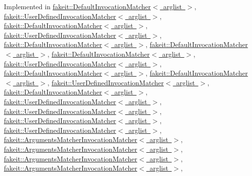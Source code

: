 Implemented in \mbox{\hyperlink{structfakeit_1_1DefaultInvocationMatcher_a6eec95726a684a4dc2498b00e68e8166}{fakeit\+::\+Default\+Invocation\+Matcher$<$ arglist $>$}}, \mbox{\hyperlink{structfakeit_1_1UserDefinedInvocationMatcher_a52f5b5e7de4484b7e9fecb166f6b80e2}{fakeit\+::\+User\+Defined\+Invocation\+Matcher$<$ arglist $>$}}, \mbox{\hyperlink{structfakeit_1_1DefaultInvocationMatcher_a6eec95726a684a4dc2498b00e68e8166}{fakeit\+::\+Default\+Invocation\+Matcher$<$ arglist $>$}}, \mbox{\hyperlink{structfakeit_1_1UserDefinedInvocationMatcher_a52f5b5e7de4484b7e9fecb166f6b80e2}{fakeit\+::\+User\+Defined\+Invocation\+Matcher$<$ arglist $>$}}, \mbox{\hyperlink{structfakeit_1_1DefaultInvocationMatcher_a6eec95726a684a4dc2498b00e68e8166}{fakeit\+::\+Default\+Invocation\+Matcher$<$ arglist $>$}}, \mbox{\hyperlink{structfakeit_1_1DefaultInvocationMatcher_a6eec95726a684a4dc2498b00e68e8166}{fakeit\+::\+Default\+Invocation\+Matcher$<$ arglist $>$}}, \mbox{\hyperlink{structfakeit_1_1DefaultInvocationMatcher_a6eec95726a684a4dc2498b00e68e8166}{fakeit\+::\+Default\+Invocation\+Matcher$<$ arglist $>$}}, \mbox{\hyperlink{structfakeit_1_1UserDefinedInvocationMatcher_a52f5b5e7de4484b7e9fecb166f6b80e2}{fakeit\+::\+User\+Defined\+Invocation\+Matcher$<$ arglist $>$}}, \mbox{\hyperlink{structfakeit_1_1DefaultInvocationMatcher_a6eec95726a684a4dc2498b00e68e8166}{fakeit\+::\+Default\+Invocation\+Matcher$<$ arglist $>$}}, \mbox{\hyperlink{structfakeit_1_1DefaultInvocationMatcher_a6eec95726a684a4dc2498b00e68e8166}{fakeit\+::\+Default\+Invocation\+Matcher$<$ arglist $>$}}, \mbox{\hyperlink{structfakeit_1_1UserDefinedInvocationMatcher_a52f5b5e7de4484b7e9fecb166f6b80e2}{fakeit\+::\+User\+Defined\+Invocation\+Matcher$<$ arglist $>$}}, \mbox{\hyperlink{structfakeit_1_1DefaultInvocationMatcher_a6eec95726a684a4dc2498b00e68e8166}{fakeit\+::\+Default\+Invocation\+Matcher$<$ arglist $>$}}, \mbox{\hyperlink{structfakeit_1_1UserDefinedInvocationMatcher_a52f5b5e7de4484b7e9fecb166f6b80e2}{fakeit\+::\+User\+Defined\+Invocation\+Matcher$<$ arglist $>$}}, \mbox{\hyperlink{structfakeit_1_1UserDefinedInvocationMatcher_a52f5b5e7de4484b7e9fecb166f6b80e2}{fakeit\+::\+User\+Defined\+Invocation\+Matcher$<$ arglist $>$}}, \mbox{\hyperlink{structfakeit_1_1UserDefinedInvocationMatcher_a52f5b5e7de4484b7e9fecb166f6b80e2}{fakeit\+::\+User\+Defined\+Invocation\+Matcher$<$ arglist $>$}}, \mbox{\hyperlink{structfakeit_1_1UserDefinedInvocationMatcher_a52f5b5e7de4484b7e9fecb166f6b80e2}{fakeit\+::\+User\+Defined\+Invocation\+Matcher$<$ arglist $>$}}, \mbox{\hyperlink{structfakeit_1_1ArgumentsMatcherInvocationMatcher_a7da0c96fb549a6bb4b944214514e4ca8}{fakeit\+::\+Arguments\+Matcher\+Invocation\+Matcher$<$ arglist $>$}}, \mbox{\hyperlink{structfakeit_1_1ArgumentsMatcherInvocationMatcher_a7da0c96fb549a6bb4b944214514e4ca8}{fakeit\+::\+Arguments\+Matcher\+Invocation\+Matcher$<$ arglist $>$}}, \mbox{\hyperlink{structfakeit_1_1ArgumentsMatcherInvocationMatcher_a7da0c96fb549a6bb4b944214514e4ca8}{fakeit\+::\+Arguments\+Matcher\+Invocation\+Matcher$<$ arglist $>$}}, \mbox{\hyperlink{structfakeit_1_1ArgumentsMatcherInvocationMatcher_a7da0c96fb549a6bb4b944214514e4ca8}{fakeit\+::\+Arguments\+Matcher\+Invocation\+Matcher$<$ arglist $>$}}, 